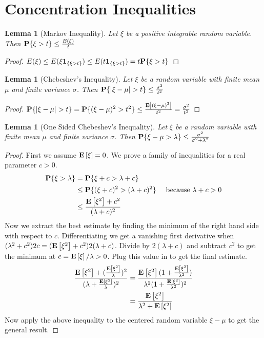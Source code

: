 \documentclass{amsart}
\newtheorem{lem}[thm]{Lemma}
\theoremstyle{remark}
\theoremstyle{definition}
\begin{document}
\section{Concentration Inequalities}
\begin{lem}[Markov Inequality]\label{MarkovInequality}Let $\xi$ be a positive integrable random variable.  Then $\textbf{P}\{\xi>t\} \leq \frac{E(\xi)}{t}$\end{lem}
\begin{proof}
$E(\xi) \leq E(\xi\textbf{1}_{\{\xi>t\}}) \leq E(t\textbf{1}_{\{\xi>t\}})=t\textbf{P}\{\xi>t\}$
\qedhere
\end{proof}

\begin{lem}[Chebeshev's Inequality]\label{ChebInequality}Let $\xi$ be a random variable with finite mean $\mu$ and finite variance $\sigma$.  Then $\probability{|\xi-\mu|>t} \leq \frac{\sigma^2}{t^2}$\end{lem}
\begin{proof}
$\probability{|\xi-\mu|>t} = \probability{(\xi-\mu)^2 > t^2} \leq \frac{\expectation{(\xi-\mu)^2}}{t^2}=\frac{\sigma^2}{t^2}$
\qedhere
\end{proof}

\begin{lem}[One Sided Chebeshev's Inequality]\label{OneSidedChebInequality}Let $\xi$ be a random variable with finite mean $\mu$ and
  finite variance $\sigma$.  Then $\textbf{P}\{\xi-\mu>\lambda\} \leq
  \frac{\sigma^2}{\sigma^2 + \lambda^2}$\end{lem}
\begin{proof}
First we assume $\textbf{E}\left[\xi\right]=0$.  We prove a family of
inequalities for a real parameter $c > 0$.
\begin{align*}
\textbf{P}\{\xi>\lambda\}  
&= \textbf{P}\{\xi + c > \lambda + c\} \\
& \leq \textbf{P}\{(\xi + c)^2 > (\lambda + c)^2\} & \textrm{ because }
\lambda+c>0 \\
& \leq \frac{\textbf{E}\left[\xi^2\right] + c^2}{(\lambda + c)^2}
\end{align*}
Now we extract the best estimate by finding the minimum of the right
hand side with respect to $c$.  Differentiating we get a vanishing
first derivative when
$
(\lambda^2 + c^2) 2c = (\textbf{E}\left[\xi^2\right] + c^2) 2(\lambda +
c)$.  Divide by $2(\lambda+ c)$  and subtract $c^2$ to get the
  minimum at $c=\textbf{E}\left[\xi\right]/\lambda > 0$.  Plug this value in to
  get the final estimate.
\begin{align*}
\frac{
  \textbf{E}\left[\xi^2\right] +
  (\frac{\textbf{E}\left[\xi^2\right]}{\lambda})^2
}
{(\lambda +
    \frac{\textbf{E}\left[\xi^2\right]}{\lambda})^2
} & =
    \frac{\textbf{E}\left[\xi^2\right](1 +
      \frac{\textbf{E}\left[\xi^2\right]}{\lambda^2})}
{
  \lambda^2 (1 + \frac{\textbf{E}\left[\xi^2\right]}{\lambda^2}
)^2
} \\
& = \frac{\textbf{E}\left[\xi^2\right]}{\lambda^2 + \textbf{E}\left[\xi^2\right]}
\end{align*}
Now apply the above inequality to the centered random variable $\xi -
\mu$ to get the general result.
\qedhere
\end{proof}
\end{document}
